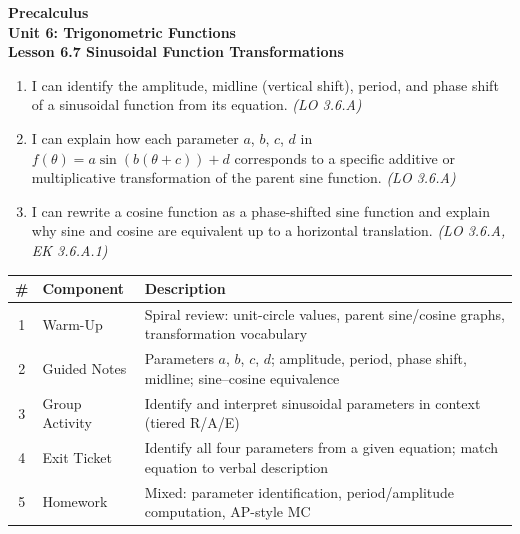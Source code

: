 \documentclass[10pt]{article}
\begin{document}
\vspace{-0.8in}

\begin{center}
  {\color{white}\textbf{\LARGE Precalculus}}\\[4pt]
  {\color{skymid}\large\textbf{Unit 6: Trigonometric Functions}}\\[6pt]
  {\color{white}\textbf{\large Lesson 6.7 \quad Sinusoidal Function Transformations}}
\end{center}

\vspace{0.22in}
\namedateperiod
\vspace{0.18in}

\begin{learningtargetbox}
\small
\begin{enumerate}[leftmargin=1.5em, itemsep=5pt]
  \item I can identify the amplitude, midline (vertical shift), period, and phase shift
    of a sinusoidal function from its equation.
    \hfill\textit{(LO 3.6.A)}
  \item I can explain how each parameter $a$, $b$, $c$, $d$ in $f(\theta)=a\sin(b(\theta+c))+d$
    corresponds to a specific additive or multiplicative transformation of the parent
    sine function. \hfill\textit{(LO 3.6.A)}
  \item I can rewrite a cosine function as a phase-shifted sine function and explain why
    sine and cosine are equivalent up to a horizontal translation.
    \hfill\textit{(LO 3.6.A, EK 3.6.A.1)}
\end{enumerate}
\end{learningtargetbox}

\vspace{0.14in}

\begin{tocbox}
\small
\renewcommand{\arraystretch}{1.5}
\begin{tabularx}{\linewidth}{@{} c l X @{}}
\rowcolor{sky}
\textbf{\#} & \textbf{Component} & \textbf{Description} \\
\midrule
1 & Warm-Up        & Spiral review: unit-circle values, parent sine/cosine graphs, transformation vocabulary \\
2 & Guided Notes   & Parameters $a$, $b$, $c$, $d$; amplitude, period, phase shift, midline; sine--cosine equivalence \\
3 & Group Activity & Identify and interpret sinusoidal parameters in context (tiered R/A/E) \\
4 & Exit Ticket    & Identify all four parameters from a given equation; match equation to verbal description \\
5 & Homework       & Mixed: parameter identification, period/amplitude computation, AP-style MC \\
\end{tabularx}
\end{tocbox}
\end{document}
